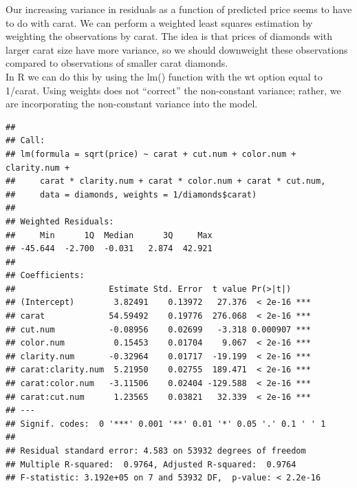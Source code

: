 \documentclass[
]{book}
\newenvironment{Shaded}{\begin{snugshade}}{\end{snugshade}}
\newcommand{\AttributeTok}[1]{\textcolor[rgb]{0.77,0.63,0.00}{#1}}
\newcommand{\DecValTok}[1]{\textcolor[rgb]{0.00,0.00,0.81}{#1}}
\newcommand{\FunctionTok}[1]{\textcolor[rgb]{0.00,0.00,0.00}{#1}}
\newcommand{\NormalTok}[1]{#1}
\newcommand{\OtherTok}[1]{\textcolor[rgb]{0.56,0.35,0.01}{#1}}
\newcommand{\SpecialCharTok}[1]{\textcolor[rgb]{0.00,0.00,0.00}{#1}}
\begin{document}
Our increasing variance in residuals as a function of predicted price seems to have to do with carat. We can perform a weighted least squares estimation by weighting the observations by carat. The idea is that prices of diamonds with larger carat size have more variance, so we should downweight these observations compared to observations of smaller carat diamonds.\\
In R we can do this by using the lm() function with the wt option equal to 1/carat.
Using weights does not ``correct'' the non-constant variance; rather, we are incorporating the non-constant variance into the model.

\begin{Shaded}
\end{Shaded}

\begin{verbatim}
## 
## Call:
## lm(formula = sqrt(price) ~ carat + cut.num + color.num + clarity.num + 
##     carat * clarity.num + carat * color.num + carat * cut.num, 
##     data = diamonds, weights = 1/diamonds$carat)
## 
## Weighted Residuals:
##     Min      1Q  Median      3Q     Max 
## -45.644  -2.700  -0.031   2.874  42.921 
## 
## Coefficients:
##                   Estimate Std. Error  t value Pr(>|t|)    
## (Intercept)        3.82491    0.13972   27.376  < 2e-16 ***
## carat             54.59492    0.19776  276.068  < 2e-16 ***
## cut.num           -0.08956    0.02699   -3.318 0.000907 ***
## color.num          0.15453    0.01704    9.067  < 2e-16 ***
## clarity.num       -0.32964    0.01717  -19.199  < 2e-16 ***
## carat:clarity.num  5.21950    0.02755  189.471  < 2e-16 ***
## carat:color.num   -3.11506    0.02404 -129.588  < 2e-16 ***
## carat:cut.num      1.23565    0.03821   32.339  < 2e-16 ***
## ---
## Signif. codes:  0 '***' 0.001 '**' 0.01 '*' 0.05 '.' 0.1 ' ' 1
## 
## Residual standard error: 4.583 on 53932 degrees of freedom
## Multiple R-squared:  0.9764, Adjusted R-squared:  0.9764 
## F-statistic: 3.192e+05 on 7 and 53932 DF,  p-value: < 2.2e-16
\end{verbatim}
\end{document}
